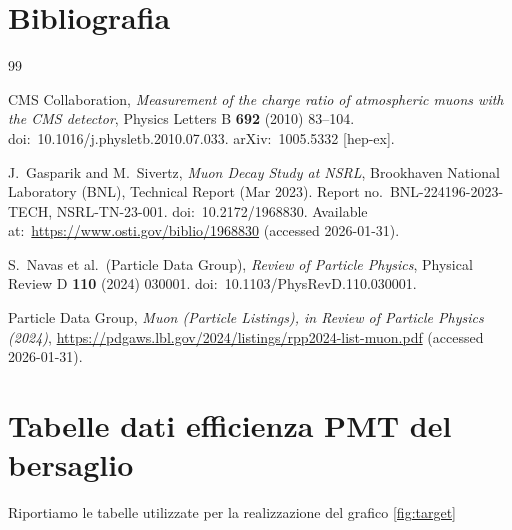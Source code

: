 \documentclass[10pt,a4paper]{article}
\begin{document}
\newpage
\section{Bibliografia}
\begin{thebibliography}{99}

CMS Collaboration,
\textit{Measurement of the charge ratio of atmospheric muons with the CMS detector},
Physics Letters B \textbf{692} (2010) 83--104.
doi:\ 10.1016/j.physletb.2010.07.033.
arXiv:\ 1005.5332 [hep-ex].

J.~Gasparik and M.~Sivertz,
\textit{Muon Decay Study at NSRL},
Brookhaven National Laboratory (BNL), Technical Report (Mar 2023).
Report no.\ BNL-224196-2023-TECH, NSRL-TN-23-001.
doi:\ 10.2172/1968830.
Available at:\ \url{https://www.osti.gov/biblio/1968830} (accessed 2026-01-31).

S.~Navas et al.\ (Particle Data Group),
\textit{Review of Particle Physics},
Physical Review D \textbf{110} (2024) 030001.
doi:\ 10.1103/PhysRevD.110.030001.

Particle Data Group,
\textit{Muon (Particle Listings), in Review of Particle Physics (2024)},
\url{https://pdgaws.lbl.gov/2024/listings/rpp2024-list-muon.pdf}
(accessed 2026-01-31).

\end{thebibliography}


\newpage
\appendix
\section{Tabelle dati efficienza PMT del bersaglio}
\label{app:target}
Riportiamo le tabelle utilizzate per la realizzazione del grafico \ref{fig:target}
\begin{table}[H]
    \begin{minipage}{0.45\linewidth}
        \centering
        \resizebox{0.8\linewidth}{!}{}
        \caption{PMT08}
        \label{tab:PMT08}
    \end{minipage}
    \hfill
    \begin{minipage}{0.45\linewidth}
        \centering
        \resizebox{0.8\linewidth}{!}{}
        \caption{PMT09}
        \label{tab:PMT09}
    \end{minipage}
    \hfill
\end{table}
\begin{table}[H]
    \begin{minipage}{0.45\linewidth}
        \centering
        \resizebox{0.8\linewidth}{!}{}
        \caption{PMT10}
        \label{tab:PMT10}
    \end{minipage}
    \hfill
    \begin{minipage}{0.45\linewidth}
        \centering
        \resizebox{0.8\linewidth}{!}{}
        \caption{PMT11}
        \label{tab:PMT11}
    \end{minipage}
    \hfill
\end{table}
\newpage
\end{document}
